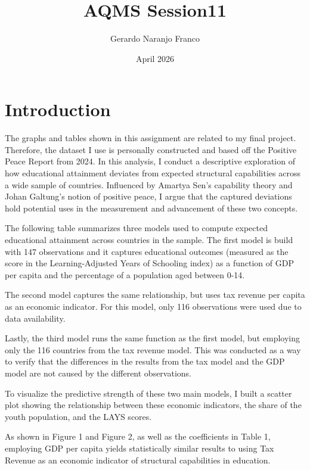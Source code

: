 \documentclass{article}
\title{AQMS Session11}
\author{Gerardo Naranjo Franco}
\date{April 2026}
\begin{document}
\maketitle

\section{Introduction}

The graphs and tables shown in this assignment are related to my final project. Therefore, the dataset I use is personally constructed and based off the Positive Peace Report from 2024. In this analysis, I conduct a descriptive exploration of how educational attainment deviates from expected structural capabilities across a wide sample of countries. Influenced by Amartya Sen's capability theory and Johan Galtung's notion of positive peace, I argue that the captured deviations hold potential uses in the measurement and advancement of these two concepts.  

The following table summarizes three models used to compute expected educational attainment across countries in the sample. The first model is build with 147 observations and it captures educational outcomes (measured as the score in the Learning-Adjusted Years of Schooling index) as a function of GDP per capita and the percentage of a population aged between 0-14.

The second model captures the same relationship, but uses tax revenue per capita as an economic indicator. For this model, only 116 observations were used due to data availability.

Lastly, the third model runs the same function as the first model, but employing only the 116 countries from the tax revenue model. This was conducted as a way to verify that the differences in the results from the tax model and the GDP model are not caused by the different observations. 
\begin{table}[H]
\centering

\label{tab:regression}
\end{table}

To visualize the predictive strength of these two main models, I built a scatter plot showing the relationship between these economic indicators, the share of the youth population, and the LAYS scores. 

As shown in Figure 1 and Figure 2, as well as the coefficients in Table 1, employing GDP per capita yields statistically similar results to using Tax Revenue as an economic indicator of structural capabilities in education. 
\end{document}
